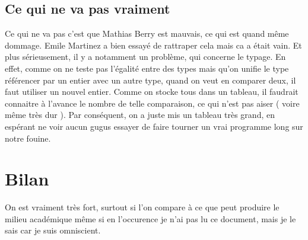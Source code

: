 \documentclass{article}
\begin{document}
\subsection{Ce qui ne va pas vraiment}
Ce qui ne va pas c'est que Mathias Berry est mauvais, ce qui est quand même dommage. Emile Martinez a bien essayé de rattraper cela mais ca a était vain. Et plus sérieusement, il y a notamment un problème, qui concerne le typage. En effet, comme on ne teste pas l'égalité entre des types mais qu'on unifie le type référencer par un entier avec un autre type, quand on veut en comparer deux, il faut utiliser un nouvel entier. Comme on stocke tous dans un tableau, il faudrait connaitre à l'avance le nombre de telle comparaison, ce qui n'est pas aiser ( voire même très dur ). Par conséquent, on a juste mis un tableau très grand, en espérant ne voir aucun gugus essayer de faire tourner un vrai programme long sur notre fouine.

\section{Bilan}
\label{bilan}

On est vraiment très fort, surtout si l'on compare à ce que peut produire le milieu académique \cite{DBLP:journals/cacm/Landin66} même si en l'occurence je n'ai pas lu ce document, mais je le sais car je suis omniscient.



\end{document}
